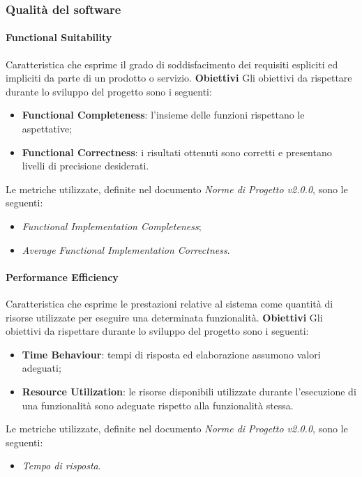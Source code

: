 \subsubsection{Qualità del software}
\paragraph{Functional Suitability} \Spazio
	Caratteristica che esprime il grado di soddisfacimento dei requisiti espliciti ed impliciti da parte di un prodotto o servizio. \Spazio
	\textbf{Obiettivi} \Spazio
	Gli obiettivi da rispettare durante lo sviluppo del progetto sono i seguenti:
	\begin{itemize}
			\item{\textbf{Functional Completeness}: l'insieme delle funzioni rispettano le aspettative;
			}
			\item{\textbf{Functional Correctness}: i risultati ottenuti sono corretti e presentano livelli di precisione desiderati.
			}
	\end{itemize}
	Le metriche utilizzate, definite nel documento \emph{Norme di Progetto v2.0.0}, sono le seguenti:
	\begin{itemize}
		\item{\emph{Functional Implementation Completeness};}
		\item{\emph{Average Functional Implementation Correctness}.}
	\end{itemize}

\paragraph{Performance Efficiency} \Spazio
	Caratteristica che esprime le prestazioni relative al sistema come quantità di risorse utilizzate per eseguire una determinata funzionalità. \Spazio
	\textbf{Obiettivi} \Spazio
	Gli obiettivi da rispettare durante lo sviluppo del progetto sono i seguenti:
	\begin{itemize}
			\item{\textbf{Time Behaviour}: tempi di risposta ed elaborazione assumono valori adeguati;
			}
			\item{\textbf{Resource Utilization}: le risorse disponibili utilizzate durante l'esecuzione di una funzionalità sono adeguate rispetto alla funzionalità stessa.
			}
	\end{itemize}
	Le metriche utilizzate, definite nel documento \emph{Norme di Progetto v2.0.0}, sono le seguenti:
	\begin{itemize}
		\item{\emph{Tempo di risposta}.}
	\end{itemize}

